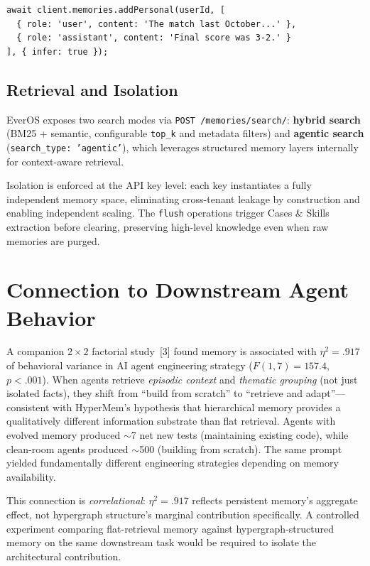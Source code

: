 \documentclass[11pt, a4paper]{article}
\begin{document}
\begin{lstlisting}[caption={Memory addition via EverOS API (TypeScript client).}]
await client.memories.addPersonal(userId, [
  { role: 'user', content: 'The match last October...' },
  { role: 'assistant', content: 'Final score was 3-2.' }
], { infer: true });
\end{lstlisting}

\subsection{Retrieval and Isolation}

EverOS exposes two search modes via \texttt{POST /memories/search/}: \textbf{hybrid search} (BM25 + semantic, configurable \texttt{top\_k} and metadata filters) and \textbf{agentic search} (\texttt{search\_type: 'agentic'}), which leverages structured memory layers internally for context-aware retrieval.

Isolation is enforced at the API key level: each key instantiates a fully independent memory space, eliminating cross-tenant leakage by construction and enabling independent scaling. The \texttt{flush} operations trigger Cases \& Skills extraction before clearing, preserving high-level knowledge even when raw memories are purged.

\section{Connection to Downstream Agent Behavior}

A companion $2 \times 2$ factorial study~[3] found memory is associated with $\eta^2 = .917$ of behavioral variance in AI agent engineering strategy ($F(1,7)=157.4$, $p<.001$). When agents retrieve \emph{episodic context} and \emph{thematic grouping} (not just isolated facts), they shift from ``build from scratch'' to ``retrieve and adapt''---consistent with HyperMem's hypothesis that hierarchical memory provides a qualitatively different information substrate than flat retrieval. Agents with evolved memory produced $\sim$7 net new tests (maintaining existing code), while clean-room agents produced $\sim$500 (building from scratch). The same prompt yielded fundamentally different engineering strategies depending on memory availability.

This connection is \emph{correlational}: $\eta^2 = .917$ reflects persistent memory's aggregate effect, not hypergraph structure's marginal contribution specifically. A controlled experiment comparing flat-retrieval memory against hypergraph-structured memory on the same downstream task would be required to isolate the architectural contribution.
\end{document}
